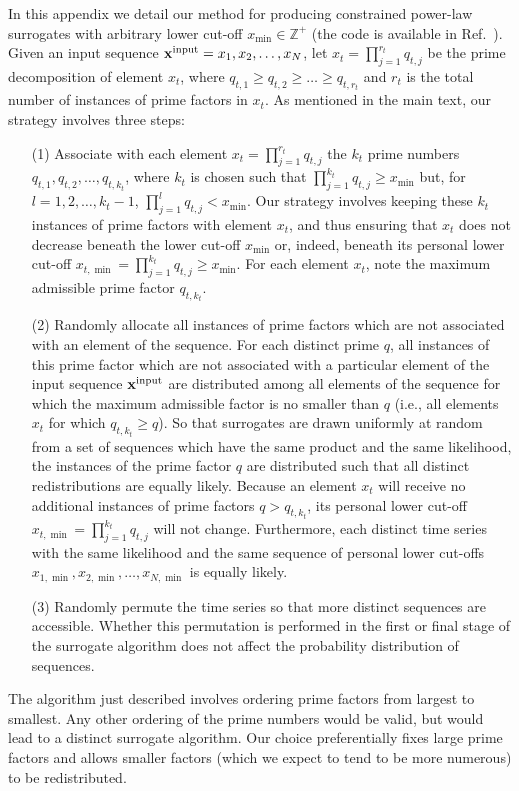 \documentclass[%
prx,
reprint,
superscriptaddress,
nofootinbib,
 amsmath,amssymb,
 aps,
floatfix,
]{revtex4-2}
\newcommand{\xin}{{{\bf x}^{\text{input}}}}
\begin{document}
In this appendix we detail our method for producing constrained power-law surrogates with arbitrary lower cut-off $x_{\min} \in \mathbb{Z}^+$ (the code is available in Ref.~\cite{github}). Given an input sequence $\xin = x_1, x_2, \ldots, x_N$, let $x_t = \prod\limits_{j=1}^{{r_t}} q_{t, j}$ be the prime decomposition of element $x_t$, where $q_{t, 1} \geq q_{t, 2} \geq \ldots \geq q_{t, {r_t}}$ and ${r_t}$ is the total number of instances of prime factors in {$x_t$}. As mentioned in the main text, our strategy involves three steps: 
\begin{itemize}
    \item[(1)] Associate with each element $x_t = \prod\limits_{j=1}^{r_t} q_{t, j}$ the $k_t$ prime numbers $q_{t, 1}, q_{t, 2}, \ldots, q_{t, k_t}$, where $k_t$ is chosen such that $\prod\limits_{j = 1}^{k_t} q_{t, j} \geq x_{\min}$ but, for $l = 1, 2, \ldots,  k_t - 1$, $\prod\limits_{j = 1}^l {q_{t, j}} < x_{\min}$. 
    Our strategy involves keeping these $k_t$ instances of prime factors with element $x_t$, and thus ensuring that $x_t$ does not decrease beneath the lower cut-off $x_{\min}$ or, indeed, beneath its personal lower cut-off $x_{t, \min} = \prod\limits_{j = 1}^{k_t} q_{t, j} \geq x_{\min}$. For each element $x_t$, note the maximum admissible prime factor $q_{t, k_t}$.
    \item[(2)] Randomly allocate all instances of prime factors which are not associated with an element of the sequence. For each distinct prime $q$, all instances of this prime factor which are not associated with a particular element of the input sequence $\xin$ are distributed among all elements of the sequence for which the maximum admissible factor is no smaller than $q$ (i.e., all elements $x_t$ for which $q_{t, k_t} \geq q$). So that surrogates are drawn uniformly at random from a set of sequences which have the same product and the same likelihood, the instances of the prime factor $q$ are distributed such that all distinct redistributions are equally likely. Because an element $x_t$ will receive no additional instances of prime factors $q > q_{t, k_t}$, its personal lower cut-off $x_{t, \min} = \prod\limits_{j = 1}^{k_t} q_{t, j}$ will not change. Furthermore, each distinct time series with the same likelihood and the same sequence of personal lower cut-offs $x_{1, \min}, x_{2, \min}, \ldots, x_{N, \min}$ is equally likely. 
    \item[(3)] Randomly permute the time series so that more distinct sequences are accessible. Whether this permutation is performed in the first or final stage of the surrogate algorithm does not affect the probability distribution of sequences. 
\end{itemize}
The algorithm just described involves ordering prime factors from largest to smallest. Any other ordering of the prime numbers would be valid, but would lead to a distinct surrogate algorithm. Our choice preferentially fixes large prime factors and allows smaller factors (which we expect to tend to be more numerous) to be redistributed.
\end{document}
